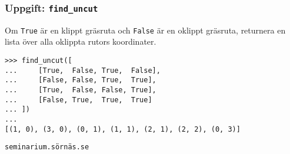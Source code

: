 \documentclass{beamer}
\begin{document}
  \begin{frame}[fragile]
    \frametitle{Uppgift: \texttt{find\_uncut}}

    Om \texttt{True} är en klippt gräsruta och \texttt{False} är en oklippt
    gräsruta, returnera en lista över alla oklippta rutors koordinater.

    \begin{verbatim}
>>> find_uncut([
...     [True,  False, True,  False],
...     [False, False, True,  True],
...     [True,  False, False, True],
...     [False, True,  True,  True]
... ])
...
[(1, 0), (3, 0), (0, 1), (1, 1), (2, 1), (2, 2), (0, 3)]
    \end{verbatim}

    \texttt{seminarium.sörnäs.se}

  \end{frame}
\end{document}
